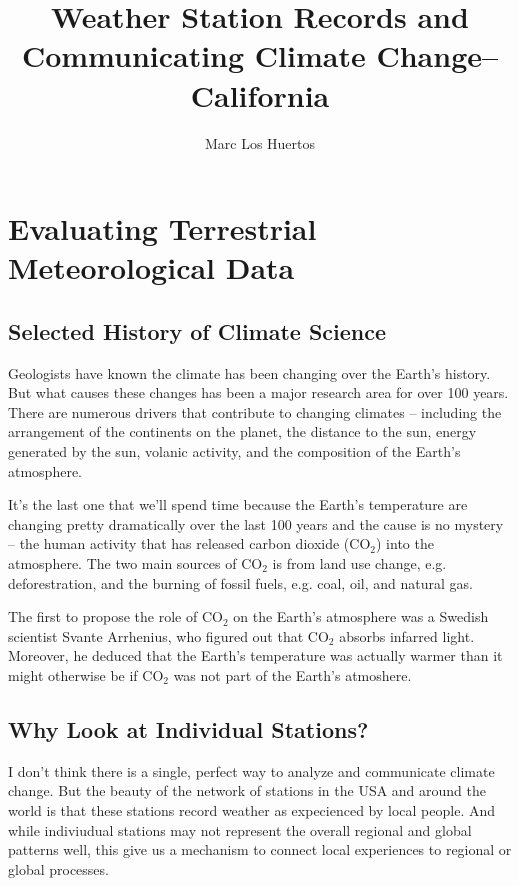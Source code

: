 \documentclass{article}
\title{Weather Station Records and Communicating Climate Change--California}
\author{Marc Los Huertos}
\begin{document}
\maketitle

\tableofcontents

\section{Evaluating Terrestrial Meteorological Data}

\subsection{Selected History of Climate Science}

Geologists have known the climate has been changing over the Earth's history. But what causes these changes has been a major research area for over 100 years. There are numerous drivers that contribute to changing climates -- including the arrangement of the continents on the planet, the distance to the sun, energy generated by the sun, volanic activity, and the composition of the Earth's atmosphere. 

It's the last one that we'll spend time because the Earth's temperature are changing pretty dramatically over the last 100 years and the cause is no mystery -- the human activity that has released carbon dioxide (CO$_2$) into the atmosphere. The two main sources of CO$_2$ is from land use change, e.g. deforestration, and the burning of fossil fuels, e.g. coal, oil, and natural gas. 

The first to propose the role of CO$_2$ on the Earth's atmosphere was a Swedish scientist Svante Arrhenius, who figured out that CO$_2$ absorbs infarred light. Moreover, he deduced that the Earth's temperature was actually warmer than it might otherwise be if CO$_2$ was not part of the Earth's atmoshere. 

\subsection{Why Look at Individual Stations?}

I don't think there is a single, perfect way to analyze and communicate climate change. But the beauty of the network of stations in the USA and around the world is that these stations record weather as expecienced by local people. And while indiviudual stations may not represent the overall regional and global patterns well, this give us a mechanism to connect local experiences to regional or global processes. 
\end{document}
